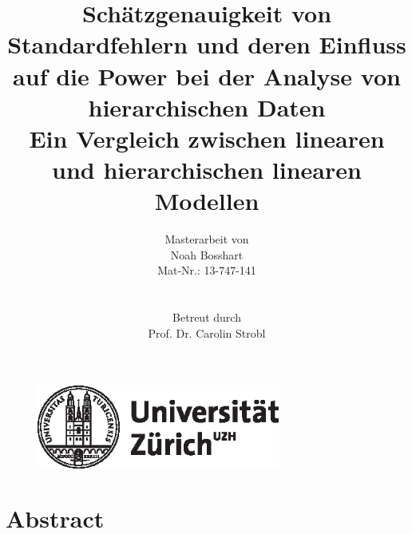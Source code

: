 \documentclass[12pt]{article}\usepackage[]{graphicx}\usepackage[]{color}
\title{Schätzgenauigkeit von Standardfehlern und deren Einfluss auf die Power bei der Analyse von hierarchischen Daten \\ \large{Ein Vergleich zwischen linearen und hierarchischen linearen Modellen}}
\author{Masterarbeit von \\ Noah Bosshart \\ Mat-Nr.: 13-747-141 \\ \\ \\ Betreut durch \\ Prof. Dr. Carolin Strobl}
\begin{document}

\begin{figure}[t]
  \centering
  \includegraphics[width = 8cm]{uzh_logo}
\end{figure}

\maketitle
\thispagestyle{empty}

\newpage
{}
\tableofcontents

\newpage
\listoffigures

\newpage
\listoftables
\newpage


\section*{Abstract}
\newpage

\end{document}

